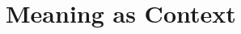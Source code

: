\documentclass[11pt]{report}
\begin{document}










\section{Meaning as Context}
\end{document}
